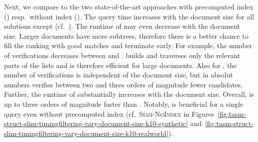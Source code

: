 Next, we compare \shinconeshort{} to the two state-of-the-art approaches with precomputed index (\structuresearchshort) resp.\ without index (\tasmpostordershort{}).
%
The query time increases with the document size for all solutions except \shinconeshort{} (cf.\ ). The runtime of \shinconeshort{} may even decrease with the document size. Larger documents have more subtrees, therefore there is a better chance to fill the ranking with good matches and terminate early. For example, the number of verifications decreases between  and .
%
\shinconeshort{} builds and traverses only the relevant parts of the lists and is therefore efficient for large documents. Also for \structuresearchshort{}, the number of verifications is independent of the document size, but in absolut numbers \shinconeshort{} verifies between two and three orders of magnitude fewer candidates. Further, the runtime of \structuresearchshort{} substantially increases with the document size. Overall, \shinconeshort{} is up to three orders of magnitude faster than \structuresearchshort{}.
%
Notably, \shinconeshort{} is beneficial for a single query even without precomputed index (cf.\ \textsc{Slim-NoIndex} in Figures~\ref{fig:tasm-struct-slim-timingfiltering-vary-document-size-k10-synthetic} and~\ref{fig:tasm-struct-slim-timingfiltering-vary-document-size-k10-realworld}).

